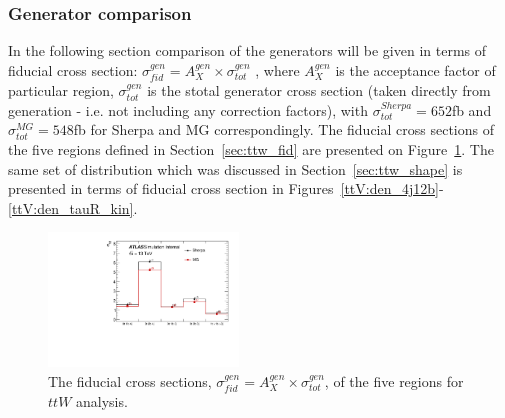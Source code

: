 %
%
%
%
%
\subsubsection{Generator comparison}
\label{sec:ttw_gen}

In the following section comparison of the generators will be given in terms of fiducial cross section: 
$\sigma_{fid}^{gen}=A_X^{gen}\times \sigma_{tot}^{gen}$ , where $A_X^{gen}$ is the acceptance factor of particular region, $\sigma_{tot}^{gen}$ is the stotal generator cross section (taken directly from generation - i.e. not including any correction factors), with  $\sigma_{tot}^{Sherpa}=652$fb and  $\sigma_{tot}^{MG}=548$fb for Sherpa and MG correspondingly. The fiducial cross sections of the five regions defined in Section~\ref{sec:ttw_fid} are presented on Figure~\ref{ttV:fid_xs}.
The same set of distribution which was discussed in Section~\ref{sec:ttw_shape} is presented in terms of fiducial cross section in Figures~\ref{ttV:den_4j12b}-\ref{ttV:den_tauR_kin}.

\begin{figure}[!htb]
\centering
\includegraphics[width=0.45\textwidth]{Plots/ttV/generator/acc_7f}
  \caption{The fiducial cross sections, $\sigma_{fid}^{gen}=A_X^{gen}\times \sigma_{tot}^{gen}$,  of the five regions for $ttW$ analysis. \label{ttV:fid_xs}}
\end{figure}


